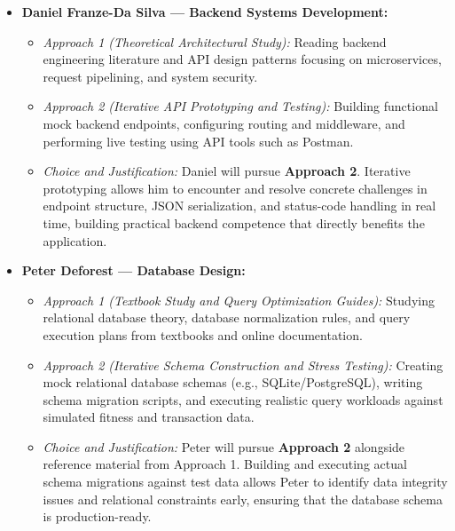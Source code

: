 \documentclass[12pt]{article}
\begin{document}
\begin{enumerate}
\begin{itemize}
    \item \textbf{Daniel Franze-Da Silva --- Backend Systems Development:}
    \begin{itemize}
      \item \textit{Approach 1 (Theoretical Architectural Study):} Reading backend engineering literature and API design patterns focusing on microservices, request pipelining, and system security.
      \item \textit{Approach 2 (Iterative API Prototyping and Testing):} Building functional mock backend endpoints, configuring routing and middleware, and performing live testing using API tools such as Postman.
      \item \textit{Choice and Justification:} Daniel will pursue \textbf{Approach 2}. Iterative prototyping allows him to encounter and resolve concrete challenges in endpoint structure, JSON serialization, and status-code handling in real time, building practical backend competence that directly benefits the application.
    \end{itemize}

    \item \textbf{Peter Deforest --- Database Design:}
    \begin{itemize}
      \item \textit{Approach 1 (Textbook Study and Query Optimization Guides):} Studying relational database theory, database normalization rules, and query execution plans from textbooks and online documentation.
      \item \textit{Approach 2 (Iterative Schema Construction and Stress Testing):} Creating mock relational database schemas (e.g., SQLite/PostgreSQL), writing schema migration scripts, and executing realistic query workloads against simulated fitness and transaction data.
      \item \textit{Choice and Justification:} Peter will pursue \textbf{Approach 2} alongside reference material from Approach 1. Building and executing actual schema migrations against test data allows Peter to identify data integrity issues and relational constraints early, ensuring that the database schema is production-ready.
    \end{itemize}


\end{itemize}
\end{enumerate}
\end{document}
